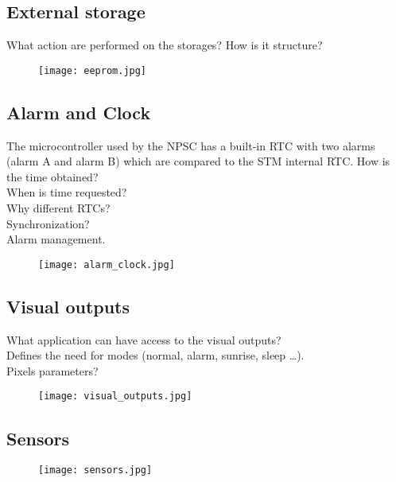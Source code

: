 \subsection{External storage}
What action are performed on the storages? How is it structure?
\begin{figure}[ht]
\centering
\texttt{[image: eeprom.jpg]}
\caption{}
\label{fig:eeprom}
\end{figure}

\subsection{Alarm and Clock}
The microcontroller used by the NPSC has a built-in RTC with two alarms (alarm A and alarm B) which are compared to the STM internal RTC. 
How is the time obtained?\\
When is time requested?\\
Why different RTCs?\\
Synchronization?\\
Alarm management.
\begin{figure}[ht]
\centering
\texttt{[image: alarm\_clock.jpg]}
\caption{}
\label{fig:alarm_clock}
\end{figure}

\subsection{Visual outputs}
What application can have access to the visual outputs?\\
Defines the need for modes (normal, alarm, sunrise, sleep \ldots).\\
Pixels parameters?\\
\begin{figure}[ht]
\centering
\texttt{[image: visual\_outputs.jpg]}
\caption{}
\label{fig:visual_outputs}
\end{figure}

\subsection{Sensors}
\begin{figure}[ht]
\centering
\texttt{[image: sensors.jpg]}
\caption{}
\label{fig:sensors}
\end{figure}

